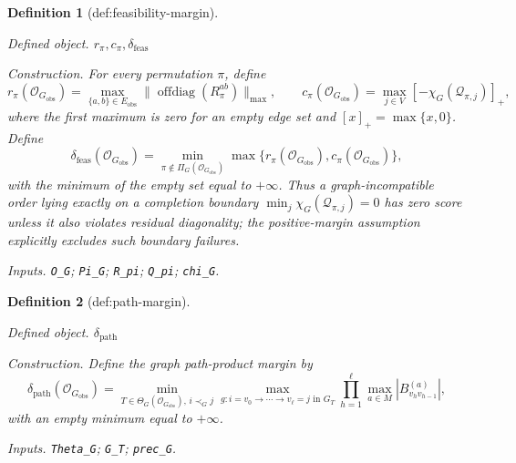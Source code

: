 \documentclass{article}
\newtheorem{definition}{Definition}
\begin{document}
\begin{definition}[def:feasibility-margin]\label{def:feasibility-margin}
\par\smallskip\noindent\emph{Defined object.} \(r_\pi,c_\pi,\delta_{\mathrm{feas}}\)
\par\smallskip\noindent\emph{Construction.} For every permutation \(\pi\), define
\[
r_\pi(\mathcal O_{G_{\mathrm{obs}}})=
\max_{\{a,b\}\in E_{\mathrm{obs}}}
\|\operatorname{offdiag}(R_\pi^{ab})\|_{\max},
\qquad
c_\pi(\mathcal O_{G_{\mathrm{obs}}})=
\max_{j\in V}[-\chi_G(\mathcal Q_{\pi,j})]_+,
\]
where the first maximum is zero for an empty edge set and \([x]_+=\max\{x,0\}\).  Define
\[
\delta_{\mathrm{feas}}(\mathcal O_{G_{\mathrm{obs}}})=
\min_{\pi\notin\Pi_G(\mathcal O_{G_{\mathrm{obs}}})}
\max\{r_\pi(\mathcal O_{G_{\mathrm{obs}}}),c_\pi(\mathcal O_{G_{\mathrm{obs}}})\},
\]
with the minimum of the empty set equal to \(+\infty\).  Thus a graph-incompatible order lying exactly on a completion boundary \(\min_j\chi_G(\mathcal Q_{\pi,j})=0\) has zero score unless it also violates residual diagonality; the positive-margin assumption explicitly excludes such boundary failures.
\par\smallskip\noindent\emph{Inputs.} \texttt{O\_\allowbreak{}G}; \texttt{Pi\_\allowbreak{}G}; \texttt{R\_\allowbreak{}pi}; \texttt{Q\_\allowbreak{}pi}; \texttt{chi\_\allowbreak{}G}.
\end{definition}

\begin{definition}[def:path-margin]\label{def:path-margin}
\par\smallskip\noindent\emph{Defined object.} \(\delta_{\mathrm{path}}\)
\par\smallskip\noindent\emph{Construction.} Define the graph path-product margin by
\[
\delta_{\mathrm{path}}(\mathcal O_{G_{\mathrm{obs}}})=
\min_{T\in\Theta_G(\mathcal O_{G_{\mathrm{obs}}}),\,i\prec_G j}
\max_{g:i=v_0\to\cdots\to v_\ell=j\text{ in }G_T}
\prod_{h=1}^{\ell}\max_{a\in M}|B_{v_hv_{h-1}}^{(a)}|,
\]
with an empty minimum equal to \(+\infty\).
\par\smallskip\noindent\emph{Inputs.} \texttt{Theta\_\allowbreak{}G}; \texttt{G\_\allowbreak{}T}; \texttt{prec\_\allowbreak{}G}.
\end{definition}
\end{document}
